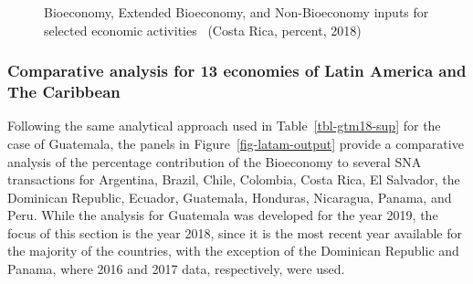 \documentclass[
  letterpaper,
  DIV=11,
  numbers=noendperiod]{scrartcl}
\begin{document}
\begin{figure}
\begin{minipage}{0.33\linewidth}
{}


\end{minipage}%
%
\begin{minipage}{0.33\linewidth}



\end{minipage}%

\caption{\label{fig-cri-sectoral}Bioeconomy, Extended Bioeconomy, and
Non-Bioeconomy inputs for selected economic activities~ (Costa Rica,
percent, 2018)}

\end{figure}%

\subsubsection{Comparative analysis for 13 economies of Latin America
and The
Caribbean}\label{comparative-analysis-for-13-economies-of-latin-america-and-the-caribbean}

Following the same analytical approach used in Table~\ref{tbl-gtm18-sup}
for the case of Guatemala, the panels in Figure~\ref{fig-latam-output}
provide a comparative analysis of the percentage contribution of the
Bioeconomy to several SNA transactions for Argentina, Brazil, Chile,
Colombia, Costa Rica, El Salvador, the Dominican Republic, Ecuador,
Guatemala, Honduras, Nicaragua, Panama, and Peru. While the analysis for
Guatemala was developed for the year 2019, the focus of this section is
the year 2018, since it is the most recent year available for the
majority of the countries, with the exception of the Dominican Republic
and Panama, where 2016 and 2017 data, respectively, were used.
\end{document}
